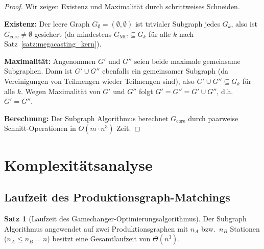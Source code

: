 ﻿\documentclass[a4paper,12pt]{article}
\theoremstyle{definition}
\newtheorem{satz}{Satz}
\begin{document}
\begin{proof}
Wir zeigen Existenz und Maximalität durch schrittweises Schneiden.

\textbf{Existenz:} Der leere Graph $G_\emptyset = (\emptyset, \emptyset)$ ist trivialer
Subgraph jedes $G_k$, also ist $G_{\mathrm{core}} \neq \emptyset$ gesichert
(da mindestens $G_{\mathrm{MC}} \subseteq G_k$ für alle $k$ nach Satz~\ref{satz:megacasting_kern}).

\textbf{Maximalität:} Angenommen $G'$ und $G''$ seien beide maximale gemeinsame Subgraphen.
Dann ist $G' \cup G''$ ebenfalls ein gemeinsamer Subgraph (da Vereinigungen von Teilmengen
wieder Teilmengen sind), also $G' \cup G'' \subseteq G_k$ für alle $k$.
Wegen Maximalität von $G'$ und $G''$ folgt $G' = G'' = G' \cup G''$, d.h.\ $G' = G''$.

\textbf{Berechnung:} Der Subgraph Algorithmus berechnet $G_{\mathrm{core}}$ durch paarweise
Schnitt-Operationen in $O(m \cdot n^3)$ Zeit.
\end{proof}

\section{Komplexitätsanalyse}

\subsection{Laufzeit des Produktionsgraph-Matchings}

\begin{satz}[Laufzeit des Gamechanger-Optimierungsalgorithmus]
\label{satz:laufzeit}
Der Subgraph Algorithmus angewendet auf zwei Produktionsgraphen mit $n_A$ bzw.\ $n_B$
Stationen ($n_A \leq n_B = n$) besitzt eine Gesamtlaufzeit von $\Theta(n^3)$.
\end{satz}
\end{document}
